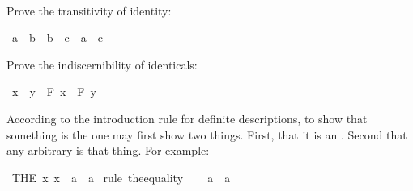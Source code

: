 \begin{isabellebody}
\isadelimproof
\ %
\endisadelimproof
%
\isatagproof
{}\isamarkupfalse%
%
\endisatagproof
{\isafoldproof}%
%
\isadelimproof
%
\endisadelimproof
%
\begin{isamarkuptext}%
\begin{Exercise} Prove the transitivity of identity: \end{Exercise}%
\end{isamarkuptext}\isamarkuptrue%
\isamarkupfalse%
\ {\isachardoublequoteopen}a\ {\isacharequal}\ b\ {\isasymlongrightarrow}\ b\ {\isacharequal}\ c\ {\isasymlongrightarrow}\ a\ {\isacharequal}\ c{\isachardoublequoteclose}%
\isadelimproof
\ %
\endisadelimproof
%
\isatagproof
{}\isamarkupfalse%
%
\endisatagproof
{\isafoldproof}%
%
\isadelimproof
%
\endisadelimproof
%
\begin{isamarkuptext}%
\begin{Exercise}[title = The Indiscernibility of Identity] Prove the indiscernibility of identicals: \end{Exercise}%
\end{isamarkuptext}\isamarkuptrue%
\isamarkupfalse%
\ {\isachardoublequoteopen}x\ {\isacharequal}\ y\ {\isasymlongrightarrow}\ {\isacharparenleft}F\ x\ {\isasymlongleftrightarrow}\ F\ y{\isacharparenright}{\isachardoublequoteclose}%
\isadelimproof
\ %
\endisadelimproof
%
\isatagproof
{}\isamarkupfalse%
%
\endisatagproof
{\isafoldproof}%
%
\isadelimproof
%
\endisadelimproof
%
\isadelimdocument
%
\endisadelimdocument
%
\isatagdocument
%
\isamarkuptrue%
%
\endisatagdocument
{\isafolddocument}%
%
\isadelimdocument
%
\endisadelimdocument
%
\begin{isamarkuptext}%
According to the introduction rule for definite descriptions, to show that something is
the  one may first show two things. First, that it is an . Second that any
arbitrary  is that thing. For example:%
\end{isamarkuptext}\isamarkuptrue%
\isamarkupfalse%
\ {\isachardoublequoteopen}{\isacharparenleft}THE\ x{\isachardot}\ x\ {\isacharequal}\ a{\isacharparenright}\ {\isacharequal}\ a{\isachardoublequoteclose}\isanewline
%
\isadelimproof
%
\endisadelimproof
%
\isatagproof
{}\isamarkupfalse%
\ {\isacharparenleft}rule\ the{\isacharunderscore}equality{\isacharparenright}\isanewline
\ \ \isamarkupfalse%
\ {\isachardoublequoteopen}a\ {\isacharequal}\ a{\isachardoublequoteclose}\isacommand{{\isachardot}{\isachardot}}\isamarkupfalse%

\end{isabellebody}
